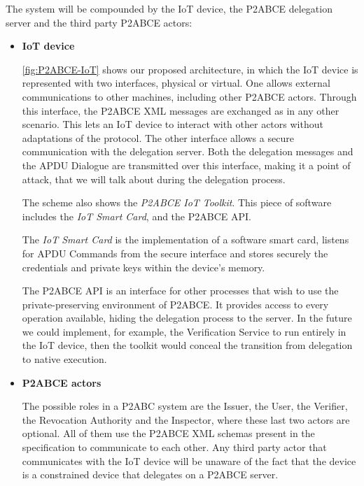
\hfil


The system will be compounded by the IoT device, the P2ABCE delegation server and the third party P2ABCE actors:

\begin{itemize}
	
	\item \textbf{IoT device}
	
	\autoref{fig:P2ABCE-IoT} shows our proposed architecture, in which the IoT device is represented with two interfaces, physical or virtual. One allows external communications to other machines, including other P2ABCE actors. Through this interface, the P2ABCE XML messages are exchanged as in any other scenario. This lets an IoT device to interact with other actors without adaptations of the protocol. The other interface allows a secure communication with the delegation server. Both the delegation messages and the APDU Dialogue are transmitted over this interface, making it a point of attack, that we will talk about during the delegation process.
	
	The scheme also shows the \textit{P2ABCE IoT Toolkit}. This piece of software includes the \textit{IoT Smart Card}, and the P2ABCE API.
	
	The \textit{IoT Smart Card} is the implementation of a software smart card, listens for APDU Commands from the secure interface and stores securely the credentials and private keys within the device's memory.
	
	The P2ABCE API is an interface for other processes that wish to use the private-preserving environment of P2ABCE. It provides access to every operation available, hiding the delegation process to the server. In the future we could implement, for example, the Verification Service to run entirely in the IoT device, then the toolkit would conceal the transition from delegation to native execution.
	
	
	\item \textbf{P2ABCE actors}
	
	The possible roles in a P2ABC system are the Issuer, the User, the Verifier, the Revocation Authority and the Inspector, where these last two actors are optional. All of them use the P2ABCE XML schemas present in the specification to communicate to each other. Any third party actor that communicates with the IoT device will be unaware of the fact that the device is a constrained device that delegates on a P2ABCE server.
	

\end{itemize}
